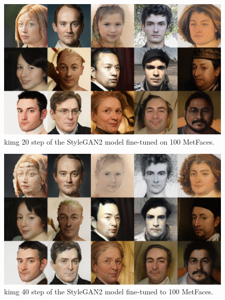 \documentclass[conference]{IEEEtran}
\begin{document}
\begin{figure}[!h]
	\begin{center}
		\includegraphics[width=0.8\columnwidth]{./images/picked_images/stylegan2_step_20_subset100_dataset.png}
		\caption{kimg 20 step of the StyleGAN2 model fine-tuned on 100 MetFaces.}
		\label{fig:figure14}
	\end{center}
\end{figure}

\begin{figure}[!h]
	\begin{center}
		\includegraphics[width=0.8\columnwidth]{./images/picked_images/stylegan2_step_40_subset100_dataset.png}
		\caption{kimg 40 step of the StyleGAN2 model fine-tuned to 100 MetFaces.}
		\label{fig:figure15}
	\end{center}
\end{figure}
\end{document}
